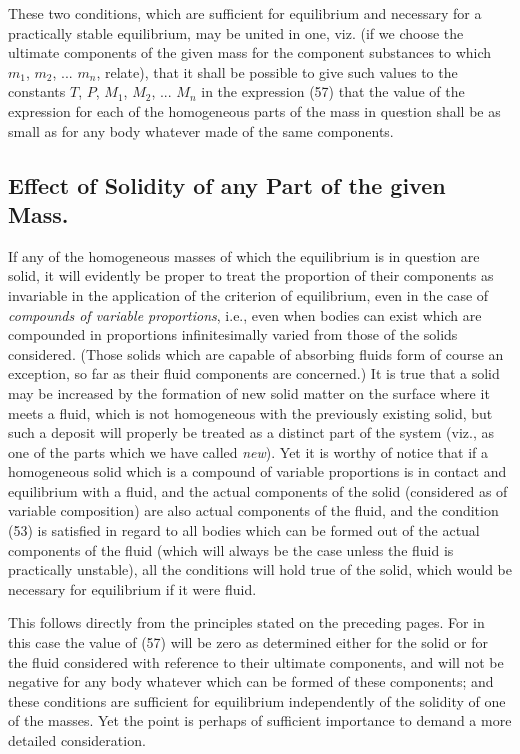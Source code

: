 \documentclass[12pt]{memoir}
\begin{document}
These two conditions, which are sufficient for equilibrium and necessary for a practically stable equilibrium, may be united in one, viz. (if we choose the ultimate components of the given mass for the component substances to which $m_1$, $m_2$, ... $m_n$, relate), that it shall be possible to give such values to the constants $T$, $P$, $M_1$, $M_2$, ... $M_n$ in the expression (57) that the value of the expression for each of the homogeneous parts of the mass in question shall be as small as for any body whatever made of the same components.

\subsection{Effect of Solidity of any Part of the given Mass.}
If any of the homogeneous masses of which the equilibrium is in question are solid, it will evidently be proper to treat the proportion of their components as invariable in the application of the criterion of equilibrium, even in the case of \textit{compounds of variable proportions}, i.e., even when bodies can exist which are compounded in proportions infinitesimally varied from those of the solids considered. (Those solids which are capable of absorbing fluids form of course an exception, so far as their fluid components are concerned.) It is true that a solid may be increased by the formation of new solid matter on the surface where it meets a fluid, which is not homogeneous with the previously existing solid, but such a deposit will properly be treated as a distinct part of the system (viz., as one of the parts which we have called \textit{new}). Yet it is worthy of notice that if a homogeneous solid which is a compound of variable proportions is in contact and equilibrium with a fluid, and the actual components of the solid (considered as of variable composition) are also actual components of the fluid, and the condition (53) is satisfied in regard to all bodies which can be formed out of the actual components of the fluid (which will always be the case unless the fluid is practically unstable), all the conditions will hold true of the solid, which would be necessary for equilibrium if it were fluid.


This follows directly from the principles stated on the preceding pages. For in this case the value of (57) will be zero as determined either for the solid or for the fluid considered with reference to their ultimate components, and will not be negative for any body whatever which can be formed of these components; and these conditions are sufficient for equilibrium independently of the solidity of one of the masses. Yet the point is perhaps of sufficient importance to demand a more detailed consideration.
\end{document}
